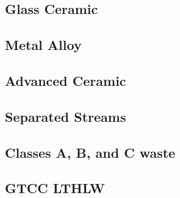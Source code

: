 \subsection{Glass Ceramic}
\subsection{Metal Alloy}
\subsection{Advanced Ceramic}
\subsection{Separated Streams}
\subsection{Classes A, B, and C waste}
\subsection{GTCC LTHLW}




